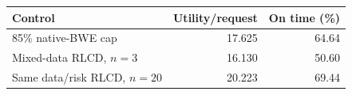 \begin{tabular}{lrr}
\toprule
Control & Utility/request & On time (\%)\\
\midrule
85\% native-BWE cap & 17.625 & 64.64\\
Mixed-data RLCD, $n=3$ & 16.130 & 50.60\\
Same data/risk RLCD, $n=20$ & 20.223 & 69.44\\
\bottomrule
\end{tabular}
